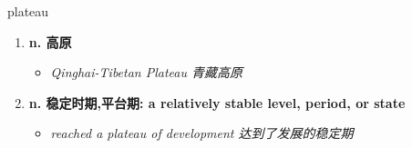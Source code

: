 
\begin{frame}
{\huge plateau}
\begin{center}
\begin{enumerate}\Large
  \item \textbf{n. 高原}
  \begin{itemize}
    \item \em{\Large{Qinghai-Tibetan Plateau 青藏高原}}
  \end{itemize}
  \item \textbf{n. 稳定时期,平台期: a relatively stable level, period, or state}
  \begin{itemize}
    \item \em{\Large{reached a plateau of development 达到了发展的稳定期}}
  \end{itemize}
\end{enumerate}
\end{center}
\end{frame}
